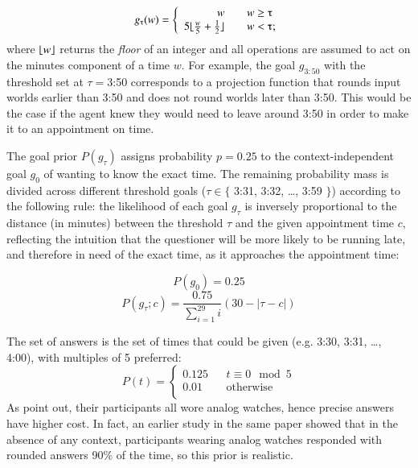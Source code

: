 \documentclass[12pt, floatsintext, jou]{apa6}
\begin{document}
\DeclarePairedDelimiter{\floor}{\lfloor}{\rfloor}

$$g_\tau(w) = \left\{
\begin{array}{rcl}
w & & w \ge \tau\\
5\floor{\frac{w}{5} + \frac{1}{2}} & & w < \tau;  \\
\end{array}
\right.
$$
where $\floor{w}$ returns the \emph{floor} of an integer and all operations are assumed to act on the minutes component of a time $w$. For example, the goal $g_{3:50}$ with the threshold set at $\tau = $3:50 corresponds to a projection function that rounds input worlds earlier than 3:50 and does not round worlds later than 3:50. This would be the case if the agent knew they would need to leave around 3:50 in order to make it to an appointment on time. 

The goal prior $P(g_\tau)$ assigns probability $p=0.25$ to the context-independent goal $g_0$ of wanting to know the exact time. The remaining probability mass is divided across different threshold goals ($\tau \in \{$ 3:31, 3:32, \dots, 3:59 $\}$) according to the following rule: the likelihood of each goal $g_\tau$ is inversely proportional to the distance (in minutes) between the threshold $\tau$ and the given appointment time $c$, reflecting the intuition that the questioner will be more likely to be running late, and therefore in need of the exact time, as it approaches the appointment time:

$$P(g_0) = 0.25$$
$$P(g_\tau; c) = \frac{0.75}{\sum_{i=1}^{29}i}(30 - |\tau - c|)$$

The set of answers is the set of times that could be given (e.g. 3:30, 3:31, \dots, 4:00), with multiples of 5 preferred:
$$P(t) = \left\{
\begin{array}{lcl}
0.125 & & t \equiv 0 \mod 5 \\
0.01 & & \textrm{otherwise} \\
\end{array}
\right.
$$ As  point out, their participants all wore analog watches, hence precise answers have higher cost. In fact, an earlier study in the same paper showed that in the absence of any context, participants wearing analog watches responded with rounded answers 90\% of the time, so this prior is realistic. 
\end{document}
